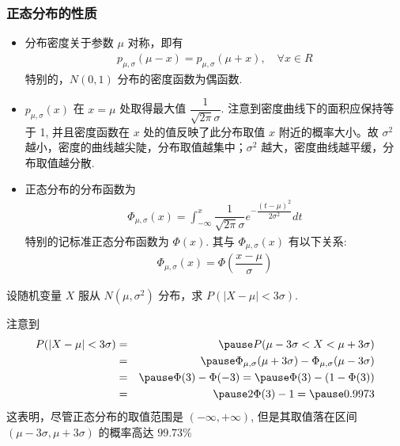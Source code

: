 \documentclass[Prob-All.tex]{subfiles}
\begin{document}
\begin{frame}
	\frametitle{正态分布的性质}
	\begin{itemize}[<+-|alert@+>]
		\item 分布密度关于参数 $\mu$ 对称，即有
		      \begin{eqnarray*}
			      p_{\mu,\sigma}(\mu-x)=p_{\mu,\sigma}(\mu+x),  \quad \forall x \in R
		      \end{eqnarray*}
		      特别的，$N (0,1)$ 分布的密度函数为偶函数.
		\item $p_{\mu,\sigma}(x)$ 在 $x=\mu$ 处取得最大值 $\dfrac{1}{\sqrt{2\pi}\sigma}$. 注意到密度曲线下的面积应保持等于 1, 并且密度函数在 $x$ 处的值反映了此分布取值 $x$ 附近的概率大小。故 $\sigma^2$ 越小，密度的曲线越尖陡，分布取值越集中；$\sigma^2$ 越大，密度曲线越平缓，分布取值越分散.
		\item 正态分布的分布函数为
		      \begin{eqnarray*}
			      \Phi_{\mu,\sigma}(x)=\int_{-\infty}^x\dfrac{1}{\sqrt{2\pi}\sigma}e^{-\dfrac{(t-\mu)^2}{2\sigma^2}}dt
		      \end{eqnarray*}
		      特别的记标准正态分布函数为 $\Phi (x)$. 其与 $\Phi_{\mu,\sigma}(x)$ 有以下关系:
		      \begin{eqnarray*}
			      \Phi_{\mu,\sigma}(x)=\Phi(\dfrac{x-\mu}{\sigma})
		      \end{eqnarray*}
	\end{itemize}
\end{frame}
\begin{frame}
	\begin{exam}[3$\sigma$ 原则] 设随机变量 $X$ 服从 $N (\mu,\sigma^2)$ 分布，求 $P (|X-\mu|<3\sigma)$.
	\end{exam}

	\pause \jieda 注意到
	\begin{eqnarray*}
		P(|X-\mu|<3\sigma)&=&\pause P(\mu-3\sigma<X<\mu+3\sigma)\\
		&=&\pause \Phi_{\mu,\sigma}(\mu+3\sigma)-\Phi_{\mu,\sigma}(\mu-3\sigma)\\
		&=&\pause \Phi(3)-\Phi(-3)=\pause \Phi(3)-(1-\Phi(3))\\
		&=&\pause 2\Phi(3)-1=\pause 0.9973
	\end{eqnarray*}
	\pause 这表明，尽管正态分布的取值范围是 $(-\infty,+\infty)$, 但是其取值落在区间 $(\mu-3\sigma,\mu+3\sigma)$ 的概率高达 $99.73\%$


\end{frame}
\end{document}
